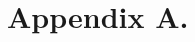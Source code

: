 \documentclass[12pts,draft]{AR_analysis_}
\begin{document}
%
%

%



%
%
%
%
%

\appendix
\section*{Appendix A.}
\end{document}
